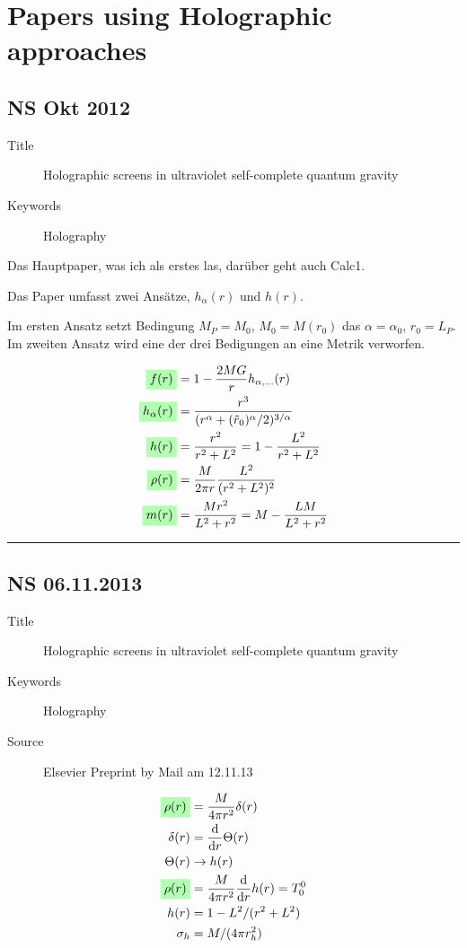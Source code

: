\documentclass[10pt,a4paper, fleqn]{article}
\newcommand{\highlight}[1]{%
  \colorbox{green!30}{$\displaystyle#1$}}
\begin{document}
\section{Papers using Holographic approaches}
\begin{multicols}{2}
\subsection{NS Okt 2012} \label{NS2012}
\begin{description}
  \item[Title] Holographic screens in ultraviolet self-complete quantum gravity
  \item[Keywords] Holography
\end{description}

Das Hauptpaper, was ich als erstes las, darüber geht auch Calc1.

Das Paper umfasst zwei Ansätze, $h_\alpha(r)$ und $h(r)$.

Im ersten Ansatz setzt Bedingung $M_P=M_0$, $M_0=M(r_0)$ das $\alpha = \alpha_0$, $r_0 = L_P$. Im zweiten Ansatz wird eine der drei Bedigungen an eine Metrik verworfen.

\vfill
\columnbreak

\begin{align}
\highlight{ f(r) } &= 1 - \frac{2 M G}{r} h_{\alpha, \dots}(r) \\
\highlight{ h_\alpha(r) } &= \frac{r^3}{(r^\alpha + (\tilde{r}_0)^\alpha / 2)^{3/\alpha}}\\
\highlight{ h(r) } &= \frac{r^2}{r^2 + L^2} = 1 - \frac{L^2}{r^2 + L^2} \\
\highlight{ \rho(r) } &= \frac{M}{2\pi r} \frac{L^2}{(r^2 + L^2)^2} \\
\highlight{ m(r) } &= \frac{Mr^2}{L^2 + r^2} = M - \frac{LM}{L^2 + r^2}
\end{align}
\end{multicols}
\rule{0.9\textwidth}{0.4pt}
\begin{multicols}{2}
\subsection{NS 06.11.2013} \label{NS2013}
\begin{description}
  \item[Title] Holographic screens in ultraviolet self-complete quantum gravity
  \item[Keywords] Holography
  \item[Source] Elsevier Preprint by Mail am 12.11.13
\end{description}

\vfill
\columnbreak

\begin{align}
\highlight{ \rho(r) } &= \frac{M}{4 \pi r^2} \delta(r) \\
\delta(r) &= \dd{}{r} \Theta(r) \\
\Theta(r) &\to h(r) \\
\highlight{ \rho(r) } &= \frac{M}{4 \pi r^2} \dd{}{r} h(r) = T^0_0 \\
h(r) &= 1 - L^2 / (r^2 + L^2) \\
\sigma_h &= M / (4 \pi r_h^2)
\end{align}
\end{multicols}
\end{document}
